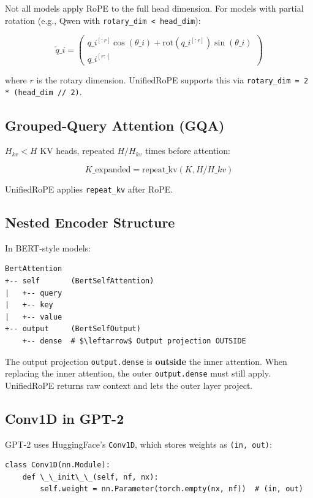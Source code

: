 Not all models apply RoPE to the full head dimension. For models with 
partial rotation (e.g., Qwen with \texttt{rotary\_dim \textless{} head\_dim}):

\[
\tilde{q}\_i = \begin{pmatrix} q\_i^{[:r]} \cos(\theta\_i) + \mathrm{rot}(q\_i^{[:r]}) \sin(\theta\_i) \\ q\_i^{[r:]} \end{pmatrix}
\tag{3.6}
\]

where $r$ is the rotary dimension. UnifiedRoPE supports this via 
\texttt{rotary\_dim = 2 * (head\_dim // 2)}.

\subsection{Grouped-Query Attention (GQA)}

$H_{kv} < H$ KV heads, repeated $H / H_{kv}$ times before attention:

\[
K\_\text{expanded} = \mathrm{repeat\_kv}(K, H / H\_{kv})
\tag{3.7}
\]

UnifiedRoPE applies \texttt{repeat\_kv} after RoPE.

\subsection{Nested Encoder Structure}

In BERT-style models:

\begin{lstlisting}
BertAttention
+-- self       (BertSelfAttention)
|   +-- query
|   +-- key
|   +-- value
+-- output     (BertSelfOutput)
    +-- dense  # $\leftarrow$ Output projection OUTSIDE
\end{lstlisting}

The output projection \texttt{output.dense} is \textbf{outside} the inner attention. 
When replacing the inner attention, the outer \texttt{output.dense} must still 
apply. UnifiedRoPE returns raw context and lets the outer layer project.

\subsection{Conv1D in GPT-2}

GPT-2 uses HuggingFace's \texttt{Conv1D}, which stores weights as \texttt{(in, out)}:

\begin{lstlisting}
class Conv1D(nn.Module):
    def \_\_init\_\_(self, nf, nx):
        self.weight = nn.Parameter(torch.empty(nx, nf))  # (in, out)
\end{lstlisting}

